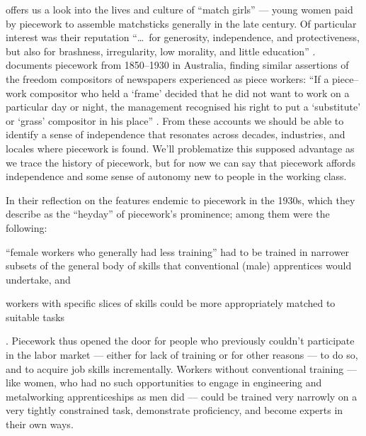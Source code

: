 \documentclass[trackingWork]{subfiles}
\begin{document}
\citeauthor{10.2307/3827491} offers us a look into the lives and culture of ``match girls''
--- young women paid by piecework to assemble matchsticks generally in the late  century.
Of particular interest was their reputation ``\dots~for generosity, independence, and protectiveness,
but also for brashness, irregularity, low morality, and little education''
\cite{10.2307/3827491}.
\citeauthor{10.2307/27508091} documents piecework from 1850--1930 in Australia,
finding similar assertions of the freedom compositors of newspapers experienced as piece workers:
``If a piece--work compositor who held a `frame' decided that he did not want to work on a particular day or night,
the management recognised his right to put a `substitute' or `grass' compositor in his place''
\cite{10.2307/27508091}.
From these accounts we should be able to identify
a sense of independence that
resonates across decades, industries, and locales where piecework is found.
We'll problematize this supposed advantage as we trace the history of piecework,
but for now we can say that piecework affords
independence and some sense of autonomy
new to people in the working class.


In their reflection on the features endemic to piecework in the 1930s,
which they describe as the ``heyday'' of piecework's prominence;
among them were the following:
\begin{inlinelist}
\item ``female workers who generally had less training'' had to be trained in narrower subsets of the general body of skills that conventional (male) apprentices would undertake, and
\item workers with specific slices of skills could be more appropriately matched to suitable tasks
\end{inlinelist}
\cite{hart2013rise}.
Piecework thus opened the door for people who previously couldn't participate in the labor market
--- either for lack of training or for other reasons ---
to do so, and to acquire job skills incrementally.
Workers without conventional training
--- like women, who had no such opportunities to engage in engineering and metalworking apprenticeships as men did ---
could be trained very narrowly on a very tightly constrained task,
demonstrate proficiency, and become experts in their own ways.
\end{document}
